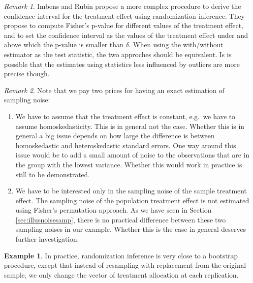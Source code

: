 \documentclass[
]{book}
\providecommand{\tightlist}{%
  \setlength{\itemsep}{0pt}\setlength{\parskip}{0pt}}
\theoremstyle{definition}
\theoremstyle{definition}
\newtheorem{example}{Example}[chapter]
\theoremstyle{definition}
\theoremstyle{definition}
\theoremstyle{remark}
\newtheorem*{remark}{Remark}
\begin{document}
\begin{remark}
\iffalse{} {Remark. } \fi{}Imbens and Rubin propose a more complex procedure to derive the confidence interval for the treatment effect using randomization inference.
They propose to compute Fisher's p-value for different values of the treatment effect, and to set the confidence interval as the values of the treatment effect under and above which the p-value is smaller than \(\delta\).
When using the with/without estimator as the test statistic, the two approches should be equivalent.
Is is possible that the estimates using statistics less influenced by outliers are more precise though.
\end{remark}

\begin{remark}
\iffalse{} {Remark. } \fi{}Note that we pay two prices for having an exact estimation of sampling noise:
\end{remark}

\begin{enumerate}
\def\labelenumi{\arabic{enumi}.}
\tightlist
\item
  We have to assume that the treatment effect is constant, e.g.~we have to assume homoskedasticity.
  This is in general not the case.
  Whether this is in general a big issue depends on how large the difference is between homoskedastic and heteroskedastic standard errors.
  One way around this issue would be to add a small amount of noise to the observations that are in the group with the lowest variance.
  Whether this would work in practice is still to be demonstrated.
\item
  We have to be interested only in the sampling noise of the sample treatment effect.
  The sampling noise of the population treatment effect is not estimated using Fisher's permutation approach.
  As we have seen in Section \ref{sec:illusnoisesamp}, there is no practical difference between these two sampling noises in our example.
  Whether this is the case in general deserves further investigation.
\end{enumerate}

\begin{example}
\protect\hypertarget{exm:unnamed-chunk-63}{}{\label{exm:unnamed-chunk-63} }In practice, randomization inference is very close to a bootstrap procedure, except that instead of resampling with replacement from the original sample, we only change the vector of treatment allocation at each replication.
\end{example}
\end{document}
